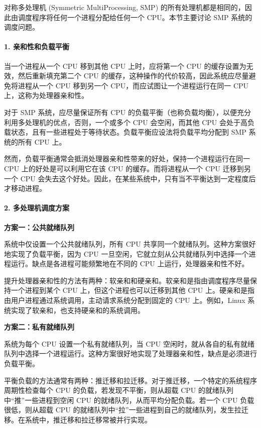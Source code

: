 \documentclass{ctexbook}
\begin{document}
	对称多处理机 (Symmetric MultiProcessing, SMP) 的所有处理机都是相同的，因此由调度程序将任何一个进程分配给任何一个 CPU。本节主要讨论 SMP 系统的调度问题。
	
	\paragraph{1. 亲和性和负载平衡}
	
	当一个进程从一个 CPU 移到其他 CPU 上时，应将第一个 CPU 的缓存设置为无效，然后重新填充第二个 CPU 的缓存，这种操作的代价较高，因此系统应尽量避免将进程从一个 CPU 移到另一个 CPU，而应试图让一个进程运行在同一 CPU 上，这称为处理器亲和性。
	
	对于 SMP 系统，应尽量保证所有 CPU 的负载平衡（也称负载均衡），以便充分利用多处理机的优点，否则，一个或多个 CPU 会空闲，而其他 CPU 会处于高负载状态，且有一些进程处于等待状态。负载平衡应设法将负载平均分配到 SMP 系统的所有 CPU 上。
	
	然而，负载平衡通常会抵消处理器亲和性带来的好处，保持一个进程运行在同一 CPU 上的好处是可以利用它在该 CPU 的缓存。而将进程从一个 CPU 迁移到另一个 CPU 会失去这个好处。因此，在某些系统中，只有当不平衡达到一定程度后才移动进程。
	
	\paragraph{2. 多处理机调度方案}
	
	\textbf{方案一：公共就绪队列}
	
	系统中仅设置一个公共就绪队列，所有 CPU 共享同一个就绪队列。这种方案很好地实现了负载平衡，因为 CPU 一旦空闲，它就立刻从公共就绪队列中选择一个进程运行。缺点是各进程可能频繁地在不同的 CPU 上运行，处理器亲和性不好。
	
	提升处理器亲和性的方法有两种：软亲和和硬亲和。软亲和是指由调度程序尽量保持一个进程到某个 CPU 上，但这个进程也可以迁移到其他 CPU 上。硬亲和是指由用户进程通过系统调用，主动请求系统分配到固定的 CPU 上。例如，Linux 系统实现了软亲和，也支持硬亲和的系统调用。
	
	\textbf{方案二：私有就绪队列}
	
	系统为每个 CPU 设置一个私有就绪队列，当 CPU 空闲时，就从各自的私有就绪队列中选择一个进程运行。这种方案很好地实现了处理器亲和性，缺点是必须进行负载平衡。
	
	平衡负载的方法通常有两种：推迁移和拉迁移。对于推迁移，一个特定的系统程序周期性检查每个 CPU 的负载，若发现不平衡，则从超载 CPU 的就绪队列中“推”一些进程到空闲 CPU 的就绪队列，从而平均分配负载。若一个 CPU 负载很低，则从超载 CPU 的就绪队列中“拉”一些进程到自己的就绪队列，发生拉迁移。在系统中，推迁移和拉迁移常被并行实现。
	
\end{document}
